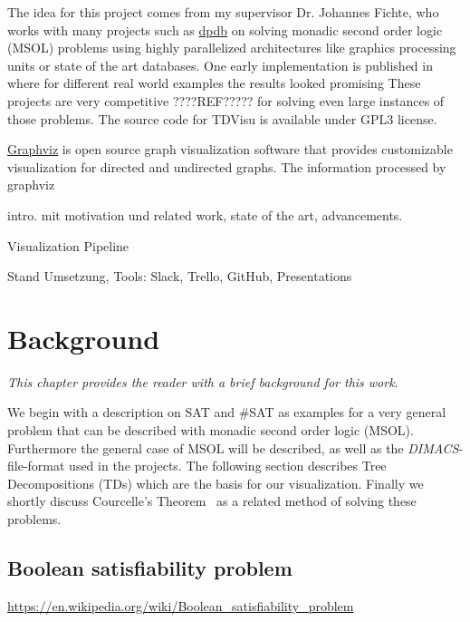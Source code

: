 \documentclass[a4paper, 12pt]{scrartcl}
\begin{document}
The idea for this project comes from my supervisor Dr. Johannes Fichte, who works with many projects such as \href{https://github.com/hmarkus/dp_on_dbs}{dpdb} on solving monadic second order logic (MSOL\cite{Courcelle2012}) problems using highly parallelized architectures like graphics processing units or state of the art databases.
One early implementation is published in \cite{evaluationMSO} where for different real world examples the results looked promising
These projects are very competitive ????REF????? for solving even large instances of those problems.
The source code for TDVisu is available under GPL3 license.

\href{https://graphviz.org/}{Graphviz} is open source graph visualization software that provides
customizable visualization for directed and undirected graphs.
The information processed by graphviz 

intro. mit motivation und related work, state of the art, advancements.

Visualization Pipeline

Stand Umsetzung, Tools: Slack, Trello, GitHub, Presentations


\newpage
\section{Background}
\textit{This chapter provides the reader with a brief background for this work}.

We begin with a description on SAT and \#SAT as examples for a very general problem that can be described with monadic second order logic (MSOL).
Furthermore the general case of MSOL will be described, as well as the \textit{DIMACS}-file-format used in the projects.
The following section describes Tree Decompositions (TDs) which are the basis for our visualization. 
Finally we shortly discuss Courcelle's Theorem~\cite{Courcelle2012} as a related method of solving these problems.

\subsection{Boolean satisfiability problem}
\url{https://en.wikipedia.org/wiki/Boolean_satisfiability_problem}
\end{document}
